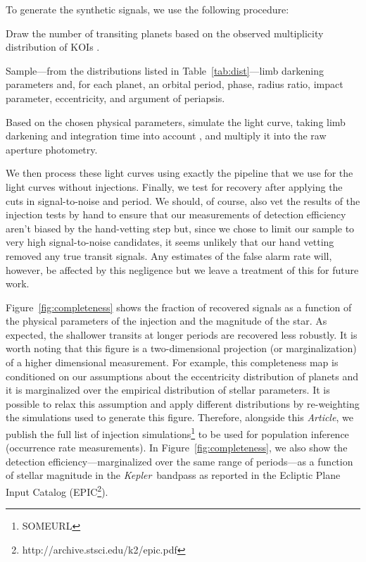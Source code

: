 \documentclass[12pt,preprint]{aastex}
\newcommand{\project}[1]{\textsl{#1}} %
\newcommand{\kepler}{\project{Kepler}}
\newcommand{\paper}{\textsl{Article}}
\newcommand{\figref}[1]{\ref{fig:#1}}
\newcommand{\Fig}[1]{Figure~\figref{#1}}
\newcommand{\fig}[1]{\Fig{#1}}
\newcommand{\Tab}[1]{Table~\ref{tab:#1}}
\newcommand{\tab}[1]{\Tab{#1}}
\begin{document}
To generate the synthetic signals, we use the following procedure:
\begin{enumerate}
{\item Draw the number of transiting planets based on the observed
multiplicity distribution of KOIs \citep{kois}.}
{\item Sample---from the distributions listed in
\tab{dist}---limb darkening parameters and, for each planet, an orbital
period, phase, radius ratio, impact parameter, eccentricity, and argument of
periapsis.}
{\item Based on the chosen physical parameters, simulate the light curve,
taking limb darkening and integration time into account \citep{ma,
kipping-int}, and multiply it into the raw aperture photometry.}
\end{enumerate}
We then process these light curves using exactly the pipeline that we use for
the light curves without injections.
Finally, we test for recovery after applying the cuts in signal-to-noise and
period.
We should, of course, also vet the results of the injection tests by hand
to ensure that our measurements of detection efficiency aren't biased by the
hand-vetting
step but, since we chose to limit our sample to very high signal-to-noise
candidates, it seems unlikely that our hand vetting removed any true transit
signals.
Any estimates of the false alarm rate will, however, be affected by this
negligence but we leave a treatment of this for future work.

\Fig{completeness} shows the fraction of recovered signals as a function of
the physical parameters of the injection and the magnitude of the star.
As expected, the shallower transits at longer periods are recovered less
robustly.
It is worth noting that this figure is a two-dimensional projection (or
marginalization) of a higher dimensional measurement.
For example, this completeness map is conditioned on our assumptions about
the eccentricity distribution of planets and it is marginalized over the
empirical distribution of stellar parameters.
It is possible to relax this assumption and apply different distributions by
re-weighting the simulations used to generate this figure.
Therefore, alongside this \paper, we publish the full list of injection
simulations\footnote{SOMEURL} to be used for population inference (occurrence
rate measurements).
In \fig{completeness}, we also show the detection efficiency---marginalized
over the same range of periods---as a function of stellar magnitude in the
\kepler\ bandpass as reported in the Ecliptic Plane Input Catalog
(EPIC\footnote{http://archive.stsci.edu/k2/epic.pdf}).
\end{document}

